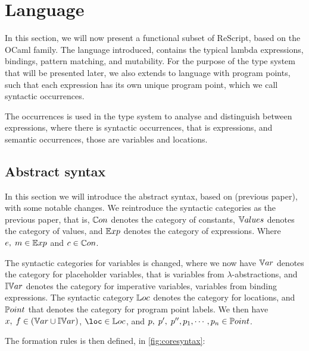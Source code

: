 \documentclass[../../master.tex]{subfiles}
\begin{document}
\section{Language}\label{sec:lang}
In this section, we will now present a functional subset of ReScript, based on the OCaml family.
The language introduced, contains the typical lambda expressions, bindings, pattern matching, and mutability.
For the purpose of the type system that will be presented later, we also extends to language with program points, such that each expression has its own unique program point, which we call syntactic occurrences.

The occurrences is used in the type system to analyse and distinguish between expressions, where there is syntactic occurrences, that is expressions, and semantic occurrences, those are variables and locations.

\subsection{Abstract syntax}
In this section we will introduce the abstract syntax, based on (previous paper), with some notable changes.
We reintroduce the syntactic categories as the previous paper, that is, $\mathbb{C}on$ denotes the category of constants, $\mathbb{V}alues$ denotes the category of values, and $\mathbb{E}xp$ denotes the category of expressions.
Where $e, \; m \in \mathbb{E}xp$ and $c \in \mathbb{C}on$.

The syntactic categories for variables is changed, where we now have $\mathbb{V}ar$ denotes the category for placeholder variables, that is variables from $\lambda$-abstractions, and $\mathbb{IV}ar$ denotes the category for imperative variables, variables from binding expressions.
The syntactic category $\mathbb{L}oc$ denotes the category for locations, and $\mathbb{P}oint$ that denotes the category for program point labels.
We then have $x,\;f\in(\mathbb{V}ar\cup\mathbb{IV}ar)$, $\loc\in\Loc$, and $p,\;p',\;p'',p_1,\cdots,p_n\in\mathbb{P}oint$.

The formation rules is then defined, in \cref{fig:coresyntax}:
\end{document}
